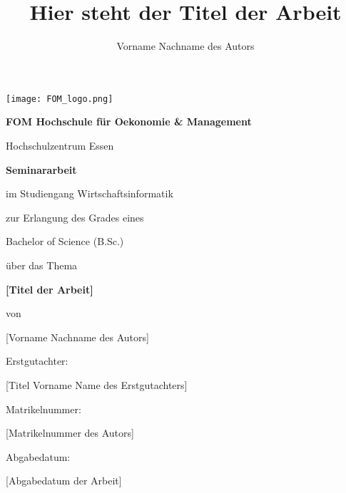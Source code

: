 \documentclass[12pt,a4paper]{article}
\title{Hier steht der Titel der Arbeit}
\author{Vorname Nachname des Autors}
\begin{document}
\newgeometry{ }

\begin{titlepage}
  \centering
  \texttt{[image: FOM\_logo.png]}\par\vspace{1cm}
  {\Large\bfseries FOM Hochschule für Oekonomie \& Management\par}
  \vspace{0.5cm}
  {\large Hochschulzentrum Essen\par}
  \vspace{1.5cm}
  {\large\bfseries Seminararbeit\par}
  \vspace{0.15cm}
  {\normalsize im Studiengang Wirtschaftsinformatik\par}
  
  \vspace{1.0cm}
  {\normalsize zur Erlangung des Grades eines\par}
  \vspace{0.15cm}
  {\large Bachelor of Science (B.Sc.)\par}
  \vspace{1cm}
  
  {über das Thema\par}
  \vspace{0.15cm}
  {\large\bfseries [Titel der Arbeit]\par}
  
  \vspace{1.0cm}
  {von\par}
  \vspace{0.15cm}
  {\normalsize [Vorname Nachname des Autors]\par}
  
\vfill 

  \begin{center}
  
	\begin{minipage}{0.8\textwidth} 
	 \raggedright 
	 Erstgutachter:  {\normalsize [Titel Vorname Name des Erstgutachters]\par}
	 \vspace{0.15cm}
	 Matrikelnummer:  {\normalsize [Matrikelnummer des Autors]\par}
	 \vspace{0.15cm}
	 Abgabedatum:  {\normalsize [Abgabedatum der Arbeit]\par}
	\end{minipage}
	
  \end{center}

\vfill 

\end{titlepage}
\end{document}
